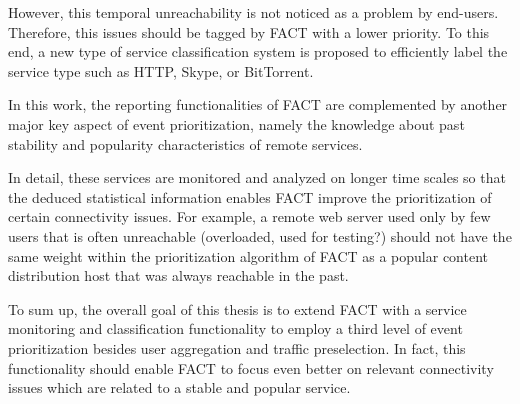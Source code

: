 \documentclass{sigcomm-alternate}
\begin{document}
However, this temporal unreachability is not noticed as a problem by end-users.
Therefore, this issues should be tagged by FACT with a lower priority.
To this end, a new type of service classification system is proposed to efficiently
label the service type such as HTTP, Skype, or BitTorrent.

In this work, the reporting functionalities of FACT are complemented by
another major key aspect of event prioritization, namely the knowledge
about past stability and popularity characteristics of remote services.

In detail, these services are monitored and analyzed on longer time scales
so that the deduced statistical information enables FACT improve
the prioritization of certain connectivity issues. For example, a
remote web server used only by few users that is often unreachable
(overloaded, used for testing?) should not have the same weight within
the prioritization algorithm of FACT as a popular content distribution
host that was always reachable in the past.


%
%
To sum up, the overall goal of this thesis is to extend FACT with
a service monitoring and classification functionality to employ a
third level of event prioritization besides user aggregation and traffic
preselection. In fact, this functionality should enable FACT to focus
even better on relevant connectivity issues which are related to a stable
and popular service.
\end{document}
